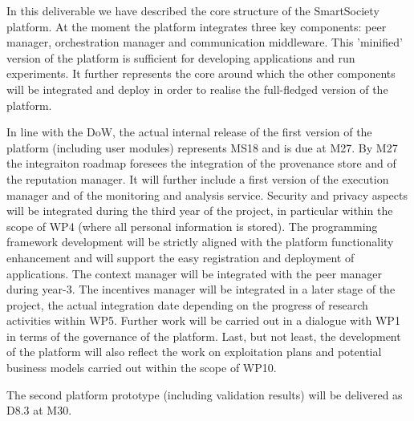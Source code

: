 In this deliverable we have described the core structure of the SmartSociety platform. At the moment the platform integrates three key components: peer manager, orchestration manager and communication middleware. This 'minified' version of the platform is sufficient for developing applications and run experiments. It further represents the core around which the other components will be integrated and deploy in order to realise the full-fledged version of the platform. 

In line with the DoW, the actual internal release of the first version of the platform (including user modules) represents MS18 and is due at M27. By M27 the integraiton roadmap foresees the integration of the provenance store and of the reputation manager. It will further include a first version of the execution manager and of the monitoring and analysis service. Security and privacy aspects will be integrated during the third year of the project, in particular within the scope of WP4 (where all personal information is stored). The programming framework development will be strictly aligned with the platform functionality enhancement and will support the easy registration and deployment of applications. The context manager will be integrated with the peer manager during year-3. The incentives manager will be integrated in a later stage of the project, the actual integration date depending on the progress of research activities within WP5. Further work will be carried out in a dialogue with WP1 in terms of the governance of the platform. Last, but not least, the development of the platform will also reflect the work on exploitation plans and potential business models carried out within the scope of WP10.

The second platform prototype (including validation results) will be delivered as D8.3 at M30. 


